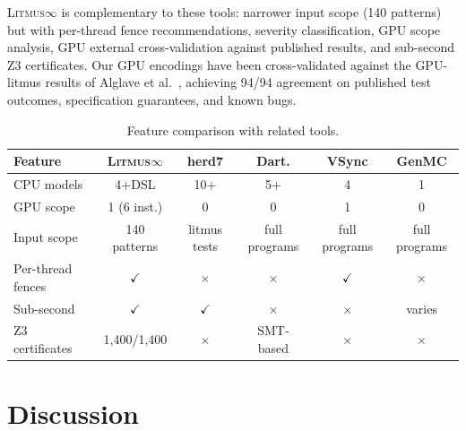 \documentclass[11pt]{article}
\newcommand{\litmus}{\textsc{Litmus$\infty$}}
\newcommand{\cmark}{$\checkmark$}
\newcommand{\xmark}{$\times$}
\begin{document}
\litmus{} is complementary to these tools: narrower input scope
(140 patterns) but with per-thread fence recommendations, severity
classification, GPU scope analysis, GPU external cross-validation
against published results, and sub-second Z3 certificates.
Our GPU encodings have been cross-validated against the GPU-litmus
results of Alglave et al.~\cite{Alglave2015GPU}, achieving 94/94
agreement on published test outcomes, specification guarantees,
and known bugs.

\begin{table}[ht]
\centering
\caption{Feature comparison with related tools.}
\label{tab:comparison}
\small
\begin{tabular}{lccccc}
\toprule
\textbf{Feature} & \textbf{\litmus{}} & \textbf{herd7} & \textbf{Dart.}
& \textbf{VSync} & \textbf{GenMC} \\
\midrule
CPU models & 4+DSL & 10+ & 5+ & 4 & 1 \\
GPU scope & 1 (6 inst.) & 0 & 0 & 1 & 0 \\
Input scope & 140 patterns & litmus tests & full programs & full programs & full programs \\
Per-thread fences & \cmark & \xmark & \xmark & \cmark & \xmark \\
Sub-second & \cmark & \cmark & \xmark & \xmark & varies \\
Z3 certificates & 1{,}400/1{,}400 & \xmark & SMT-based & \xmark & \xmark \\
\bottomrule
\end{tabular}
\end{table}

\section{Discussion}
\label{sec:discussion}
\end{document}
